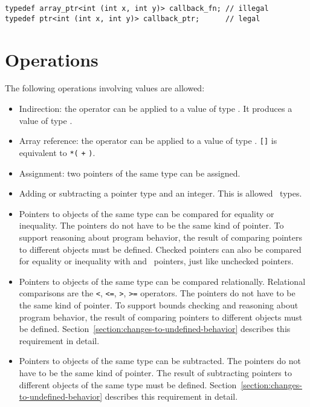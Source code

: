 \begin{lstlisting}
typedef array_ptr<int (int x, int y)> callback_fn; // illegal
typedef ptr<int (int x, int y)> callback_ptr;      // legal
\end{lstlisting}

\section{Operations}

The following operations involving \arrayptrT values are allowed:

\begin{itemize}
\item
  Indirection: the \code{*} operator can be applied to a value of type
  \arrayptrT. It produces a value of type . 
\item
  Array reference: the \code{[]} operator can be applied to a
  value of type \arrayptrT.
  \lstinline|[|\lstinline|]| is equivalent to
  \lstinline|*(| \lstinline|+| \lstinline|)|.
\item
  Assignment: two pointers of the same type can be assigned.
\item
  Adding or subtracting a pointer type and an integer. This is allowed
  \arrayptrT\ types.
\item
  Pointers to objects of the same type can be compared for equality or
  inequality. The pointers do not have to be the same kind of pointer.
  To support reasoning about program behavior, the result of comparing
  pointers to different objects must be defined.  Checked pointers can also
  be compared for equality or inequality with  and \void\ pointers,
  just like unchecked pointers.
\item
  Pointers to objects of the same type can be compared relationally. Relational comparisons are the
  \lstinline|<|, \lstinline|<=|, \lstinline|>|, \lstinline|>=| operators. The pointers do not have
  to be
  the same kind of pointer. To support bounds checking and reasoning about program behavior, the
  result of comparing pointers to different objects must be defined.
  Section~\ref{section:changes-to-undefined-behavior} describes this requirement in detail.
\item
  Pointers to objects of the same type can be subtracted. The pointers do not have to be
  the same kind of
  pointer. The result of subtracting pointers to different objects of
  the same type must be defined. Section~\ref{section:changes-to-undefined-behavior}
  describes this requirement in detail.
\end{itemize}

